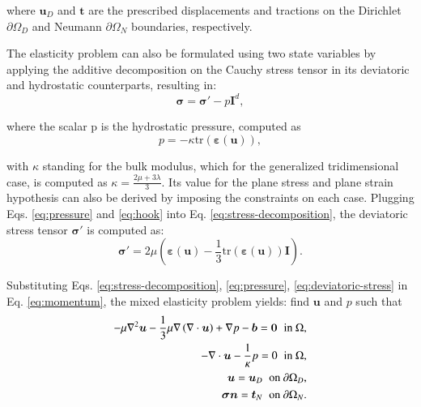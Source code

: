 \documentclass[english,11pt,3p,number,sort&compress]{elsarticle}
\begin{document}
\noindent where $\bm{u}_D$ and $\bm{t}$ are the prescribed displacements and tractions on the Dirichlet $\partial\Omega_D$ and Neumann $\partial\Omega_N$ boundaries, respectively.

The elasticity problem can also be formulated using two state variables by applying the additive decomposition on the Cauchy stress tensor in its deviatoric and hydrostatic counterparts, resulting in:
\begin{equation} \label{eq:stress-decomposition}
	\bm{\sigma} = \bm{\sigma}' - p\bm{I}^d ,
\end{equation}

\noindent where the scalar p is the hydrostatic pressure, computed as
\begin{equation} \label{eq:pressure}
	p = -\kappa \text{tr}(\bm{\varepsilon}(\bm{u})) ,
\end{equation}

\noindent with $\kappa$ standing for the bulk modulus, which for the generalized tridimensional case, is computed as $\kappa=\frac{2\mu+3\lambda}{3}$. Its value for the plane stress and plane strain hypothesis can also be derived by imposing the constraints on each case. Plugging Eqs. \eqref{eq:pressure} and \eqref{eq:hook} into Eq. \eqref{eq:stress-decomposition}, the deviatoric stress tensor $\boldsymbol{\sigma}'$ is computed as:
\begin{equation} \label{eq:deviatoric-stress}
	\boldsymbol{\sigma}' = 2\mu \left(\boldsymbol{\varepsilon}(\bm{u}) - \frac{1}{3}\text{tr}(\boldsymbol{\varepsilon}(\bm{u}))\mathbf{I}\right) \text{.}
\end{equation}

Substituting Eqs. \eqref{eq:stress-decomposition}, \eqref{eq:pressure}, \eqref{eq:deviatoric-stress} in Eq. \eqref{eq:momentum}, the mixed elasticity problem yields: find $\mathbf{u}$ and $p$ such that
\begin{subequations} \label{eq:mixed-elasticity}
	\begin{align}
		-\mu\nabla^2\bm{u} -\frac{1}{3}\mu\nabla\left(\nabla \cdot \bm{u} \right) + \nabla p -\bm{b}= \bm{0} \hspace{0.2cm} \text{in } \Omega ,& \label{eq:mixed-elasticity-a}\\ 
		-\nabla \cdot \bm{u} -\frac{1}{\kappa}p= 0 \hspace{0.2cm} \text{in } \Omega ,& \label{eq:mixed-elasticity-b}\\ 
		\bm{u} = \bm{u}_D \hspace{0.2cm} \text{on } \partial\Omega_D ,&\\
		\bm{\sigma} \bm{n} = \bm{t}_N \hspace{0.2cm} \text{on } \partial\Omega_N .&
	\end{align}
\end{subequations}
\end{document}

